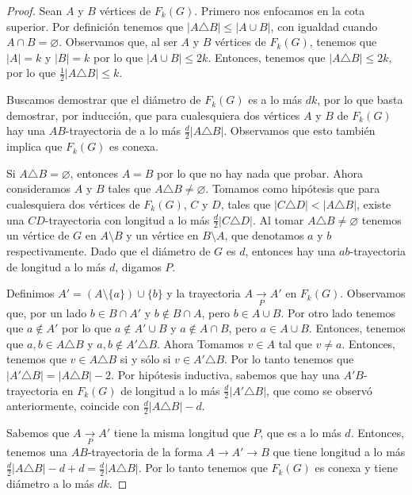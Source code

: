 \begin{proof}
Sean $A$ y $B$ v\'ertices de $F_{k}(G)$. Primero nos enfocamos en la cota
superior. Por definici\'on tenemos que $|A \triangle B| \leq |A \cup B|$, con
igualdad cuando $A \cap B = \varnothing$. Observamos que, al ser $A$ y $B$
v\'ertices de $F_{k}(G)$, tenemos que $|A|=k$ y $|B|=k$ por lo que $|A \cup B|
\le 2k$. Entonces, tenemos que $|A \triangle B| \leq 2k$, por lo que
$\frac{1}{2} |A \triangle B| \leq k$.

Buscamos demostrar que el di\'ametro de $F_{k}(G)$ es a lo m\'as $d k$, por
lo que basta demostrar, por inducci\'on, que para cualesquiera dos v\'ertices
$A$ y $B$ de $F_{k}(G)$ hay una $AB$-trayectoria de a lo m\'as
$\frac{d}{2}|A\triangle B|$. Observamos que esto tambi\'en implica que
$F_{k}(G)$ es conexa.

Si $A\triangle B=\varnothing$, entonces $A=B$ por lo que no hay nada que probar.
Ahora consideramos $A$ y $B$ tales que $A\triangle B \neq \varnothing$. Tomamos
como hip\'otesis que para cualesquiera dos v\'ertices de $F_{k}(G)$, $C$ y $D$,
tales que $|C\triangle D|<|A \triangle B|$, existe una $CD$-trayectoria con
longitud a lo m\'as $\frac{d}{2}|C\triangle D|$. Al tomar $A\triangle B
\neq \varnothing$ tenemos un v\'ertice de $G$ en $A\setminus B$ y un v\'ertice
en $B\setminus A$, que denotamos $a$ y $b$ respectivamente. Dado que el
di\'ametro de $G$ es $d$, entonces hay una $ab$-trayectoria de longitud a
lo m\'as $d$, digamos $P$.

Definimos $A'=(A\setminus \{a\})\cup \{b\}$ y la trayectoria $A\xrightarrow[P]{}
A'$ en $F_{k}(G)$. Observamos que, por un lado $b\in B\cap A'$ y $b\notin B\cap
A$, pero $b\in A\cup B$. Por otro lado tenemos que $a\notin A'$ por lo que
$a\notin A'\cup B$ y $a\notin A\cap B$, pero $a\in A\cup B$. Entonces, tenemos
que $a,b \in A\triangle B$ y $a,b \notin A'\triangle B$. Ahora Tomamos $v\in A$
tal que $v \neq a$. Entonces, tenemos que $v \in A\triangle B$ si y s\'olo si
$v\in A'\triangle B$. Por lo tanto tenemos que $|A'\triangle B|=|A \triangle B|-
2$. Por hip\'otesis inductiva, sabemos que hay una $A'B$-trayectoria en
$F_{k}(G)$ de longitud a lo m\'as $\frac{d}{2}|A'\triangle B|$, que como se
observ\'o anteriormente, coincide con $\frac{d}{2}|A\triangle B| - d$.

Sabemos que $A\xrightarrow[P]{} A'$ tiene la misma longitud que $P$, que es a lo
m\'as $d$. Entonces, tenemos una $AB$-trayectoria de la forma $A\rightarrow
A'\rightarrow B$ que tiene longitud a lo m\'as $\frac{d}{2}|A\triangle
B|-d +d =\frac{d}{2}|A\triangle B|$. Por lo tanto tenemos que
$F_{k}(G)$ es conexa y tiene di\'ametro a lo m\'as $d k$.


\end{proof}
